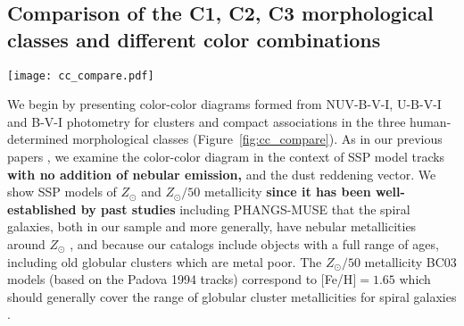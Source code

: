 \documentclass[linenumbers]{aastex63}
\begin{document}
\subsection{Comparison of the C1, C2, C3 morphological classes and different color combinations}\label{ssect:cc_overview}
%
\begin{figure*} 
\texttt{[image: cc\_compare.pdf]}
 \caption{Color-color diagrams for the PHANGS-HST human classified sample, with each morphological class shown separately: C1 single-peaked symmetric clusters (left column); C2 single-peaked asymmetric clusters (middle column); and C3 multi-peaked compact associations (right column). In all panels V-I is plotted along the horizontal axis, and three other colors are shown along the vertical axis: NUV-B (top row), U-B (middle row) and B-V (bottom row).  We only show data points for clusters which are detected with at least a ${\rm S/N > 3}$ in the plotted bands. 
 Individual clusters are represented by black dots whereas in crowded regions we show a Gaussian-smoothed heat map indicating the relative density. 
 The size of the smoothing kernel is shown by a red circle on the top middle panel.
 A cyan track denotes the  SSP model for ${\rm Z_{\odot}}$ metallicity at ages from 1\,Myr till 13.7\,Gyr. The portion of the SSP track ${\rm Z_{\odot}/50}$ metallicity from 0.5-13.7\,Gyr is also shown with a magenta track. Key ages are indicated on the right column and are marked with blue and pink dots on each track.  A reddening vector (top right of each panel) corresponds to ${\rm A_v = 1.0 mag}$. In panel d), we indicate names for relevant loci in the color-color space.}
 \label{fig:cc_compare}
\end{figure*}
%
We begin by presenting color-color diagrams formed from NUV-B-V-I, U-B-V-I and B-V-I photometry for clusters and compact associations in the three human-determined morphological classes (Figure~\ref{fig:cc_compare}).  As in our previous papers \citep[e.g.,][]{turner_phangs-hst_2021,lee_phangs-hst_2022,deger_bright_2022}, we examine the color-color diagram in the context of   SSP model tracks \textbf{with no addition of nebular emission,} and the dust reddening vector.  We show SSP models of $Z_{\odot}$ and $Z_{\odot}/50$ metallicity \textbf{since it has been well-established by past studies} including PHANGS-MUSE that the spiral galaxies, both in our sample and more generally, have nebular metallicities around $Z_{\odot}$ \citep[e.g.,][]{zkh94, skillman_virgo_96, moustakas10, groves_phangs-muse_2023, scheuermann_stellar_2023}, and because our catalogs include objects with a full range of ages, including old globular clusters which are metal poor. The $Z_{\odot}/50$ metallicity BC03 models (based on the Padova 1994 tracks) correspond to $[$Fe/H$]=1.65$ which should generally cover the range of globular cluster metallicities for spiral galaxies \citep[][and references therein]{BS06}. 
\end{document}
